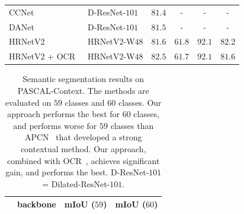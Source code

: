 \documentclass[10pt,journal,compsoc]{IEEEtran}
\begin{document}
\begin{table}[t]
\begin{tabular}{l|l|cccc}
			CCNet~\cite{HuangWHHWL2019} & D-ResNet-$101$ & $81.4$ & - & - & -\\
            DANet~\cite{FuLYL19} & D-ResNet-$101$ & $81.5$ & - & - & - \\
			\hline
			HRNetV$2$ &  HRNetV$2$-W$48$  & $81.6$ & $\mathbf{61.8}$ & $\mathbf{92.1}$ & $\mathbf{82.2}$ \\
			HRNetV$2$ + OCR~\cite{YuanCW18} & HRNetV$2$-W$48$ &  $\mathbf{82.5}$ & $61.7$ &$\mathbf{92.1}$ & $81.6$\\
			\hline
		\end{tabular}
		\vspace{-2mm}
	\end{table}
	
	\renewcommand{\arraystretch}{1.3}
	\setlength{\tabcolsep}{3.0pt}
	\begin{table}[t]
	\scriptsize
	\centering
	\caption{Semantic segmentation results on PASCAL-Context. The methods are
	evaluated on $59$ classes and $60$ classes.
	{Our approach performs
	the best for $60$ classes,
	and performs worse for $59$ classes
	than APCN~\cite{HeDZWQ}
	that developed a strong contextual method.
	Our approach, combined with OCR~\cite{YuanCW18},
	achieves significant gain, and
	performs the best.
	}
	D-ResNet-$101$ = Dilated-ResNet-$101$.}
	\label{tab:pasctxresults}
	\vspace{-.3cm}
	\begin{tabular}{l@{~~~~}|@{~~~~}l@{~~~~}|@{~~~~}c@{~~~~}c}
		\hline%
		  & backbone & mIoU ($59$) & mIoU ($60$) \\
		\hline
		

\end{tabular}
\end{table}
\end{document}
